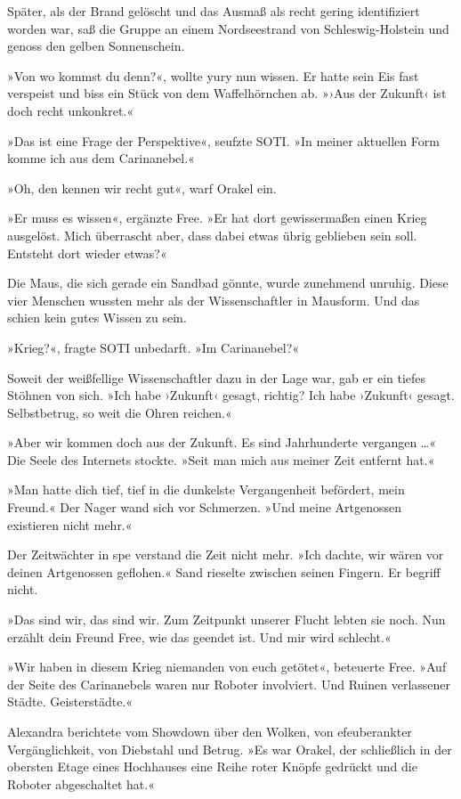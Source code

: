 Später, als der Brand gelöscht und das Ausmaß als recht gering identifiziert worden war, saß die Gruppe an einem Nordseestrand von Schleswig-Holstein und genoss den gelben Sonnenschein.

»Von wo kommst du denn?«, wollte yury nun wissen. Er hatte sein Eis fast verspeist und biss ein Stück von dem Waffelhörnchen ab. »›Aus der Zukunft‹ ist doch recht unkonkret.«

»Das ist eine Frage der Perspektive«, seufzte SOTI. »In meiner aktuellen Form komme ich aus dem Carinanebel.«

»Oh, den kennen wir recht gut«, warf Orakel ein.

»Er muss es wissen«, ergänzte Free. »Er hat dort gewissermaßen einen Krieg ausgelöst. Mich überrascht aber, dass dabei etwas übrig geblieben sein soll. Entsteht dort wieder etwas?«

Die Maus, die sich gerade ein Sandbad gönnte, wurde zunehmend unruhig. Diese vier Menschen wussten mehr als der Wissenschaftler in Mausform. Und das schien kein gutes Wissen zu sein.

»Krieg?«, fragte SOTI unbedarft. »Im Carinanebel?«

Soweit der weißfellige Wissenschaftler dazu in der Lage war, gab er ein tiefes Stöhnen von sich. »Ich habe ›Zukunft‹ gesagt, richtig? Ich habe ›Zukunft‹ gesagt. Selbstbetrug, so weit die Ohren reichen.«

»Aber wir kommen doch aus der Zukunft. Es sind Jahrhunderte vergangen …« Die Seele des Internets stockte. »Seit man mich aus meiner Zeit entfernt hat.«

»Man hatte dich tief, tief in die dunkelste Vergangenheit befördert, mein Freund.« Der Nager wand sich vor Schmerzen. »Und meine Artgenossen existieren nicht mehr.«

Der Zeitwächter in spe verstand die Zeit nicht mehr. »Ich dachte, wir wären vor deinen Artgenossen geflohen.« Sand rieselte zwischen seinen Fingern. Er begriff nicht.

»Das sind wir, das sind wir. Zum Zeitpunkt unserer Flucht lebten sie noch. Nun erzählt dein Freund Free, wie das geendet ist. Und mir wird schlecht.«

»Wir haben in diesem Krieg niemanden von euch getötet«, beteuerte Free. »Auf der Seite des Carinanebels waren nur Roboter involviert. Und Ruinen verlassener Städte. Geisterstädte.«

Alexandra berichtete vom Showdown über den Wolken, von efeuberankter Vergänglichkeit, von Diebstahl und Betrug. »Es war Orakel, der schließlich in der obersten Etage eines Hochhauses eine Reihe roter Knöpfe gedrückt und die Roboter abgeschaltet hat.«

